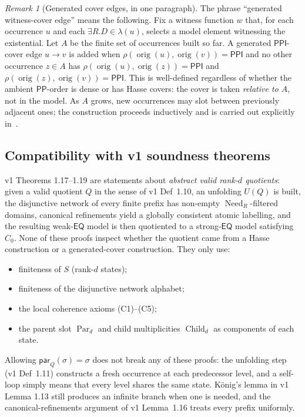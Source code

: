 \documentclass[11pt]{article}
\theoremstyle{definition}
\theoremstyle{remark}
\newtheorem{remark}[theorem]{Remark}
\newcommand{\PP}{\mathsf{PP}}
\newcommand{\PPI}{\mathsf{PPI}}
\newcommand{\EQ}{\mathsf{EQ}}
\newcommand{\Child}{\operatorname{Child}}
\newcommand{\Par}{\operatorname{Par}}
\newcommand{\Need}{\operatorname{Need}}
\newcommand{\orig}{\operatorname{orig}}
\begin{document}
\begin{remark}[Generated cover edges, in one paragraph]
\label{rem:generated-covers}
The phrase ``generated witness-cover edge''
\cite{GPT55Survival,CompletenessV2} means the following. Fix a
witness function $w$ that, for each occurrence $u$ and each
$\exists R.D \in \lambda(u)$, selects a model element witnessing
the existential. Let $A$ be the finite set of occurrences built
so far. A generated $\PPI$-cover edge $u \to v$ is added when
$\rho(\orig(u),\orig(v)) = \PPI$ and no other occurrence
$z \in A$ has $\rho(\orig(u),\orig(z)) = \PPI$ and
$\rho(\orig(z),\orig(v)) = \PPI$.  This is well-defined regardless
of whether the ambient $\PP$-order is dense or has Hasse covers:
the cover is taken \emph{relative to $A$}, not in the model. As
$A$ grows, new occurrences may slot between previously adjacent
ones; the construction proceeds inductively and is carried out
explicitly in~\cite[Construction 5.1]{CompletenessV2}.
\end{remark}

\subsection{Compatibility with v1 soundness theorems}

v1 Theorems 1.17--1.19 are statements about \emph{abstract valid
rank-$d$ quotients}: given a valid quotient $Q$ in the sense of
v1 Def~1.10, an unfolding $U(Q)$ is built, the disjunctive network
of every finite prefix has non-empty $\Need_R$-filtered domains,
canonical refinements yield a globally consistent atomic
labelling, and the resulting weak-$\EQ$ model is then quotiented
to a strong-$\EQ$ model satisfying $C_0$. None of these proofs
inspect whether the quotient came from a Hasse construction or a
generated-cover construction. They only use:
\begin{itemize}
  \item finiteness of $S$ (rank-$d$ states);
  \item finiteness of the disjunctive network alphabet;
  \item the local coherence axioms (C1)--(C5);
  \item the parent slot $\Par_d$ and child multiplicities
    $\Child_d$ as components of each state.
\end{itemize}
Allowing $\mathsf{par}_Q(\sigma) = \sigma$ does not break any of
these proofs: the unfolding step (v1 Def~1.11) constructs a fresh
occurrence at each predecessor level, and a self-loop simply
means that every level shares the same state. König's lemma in
v1 Lemma 1.13 still produces an infinite branch when one is
needed, and the canonical-refinements argument of v1 Lemma~1.16
treats every prefix uniformly.
\end{document}
